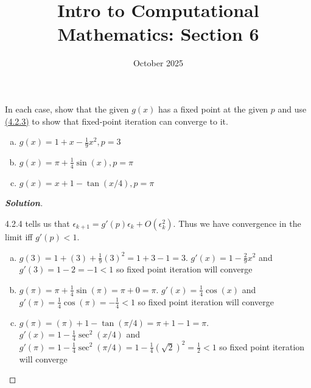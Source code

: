 \documentclass[11pt]{article}
\title{Intro to Computational Mathematics: Section 6}
\date{October 2025}
\newenvironment{problem}[2][Question]{\begin{trivlist}
\item[\hskip \labelsep {\bfseries #1}\hskip \labelsep {\bfseries #2.}]}{\end{trivlist}}
\newenvironment{solution}{%
  \begin{proof}[\textbf{Solution}]$ $\par\nobreak\ignorespaces
}{%
  \end{proof}
}
\theoremstyle{definition}
\begin{document}
\maketitle

\begin{problem}{4.2.1}
In each case, show that the given $g(x)$ has a fixed point at the given $p$ and use \href{https://fncbook.com/fixed-point/#fpconverge}{(4.2.3)} to show that fixed-point iteration can converge to it.
\begin{enumerate}[(a)]
    \item $g(x) = 1 + x - \frac{1}{9}x^2, p = 3$
    \item $g(x) = \pi + \frac{1}{4}\sin(x), p = \pi$
    \item $g(x) = x + 1 - \tan(x/4), p = \pi$
\end{enumerate}
\end{problem}
\begin{solution}
4.2.4 tells us that $\epsilon_{k+1} = g'(p)\epsilon_k + O(\epsilon_k^2)$. Thus we have convergence in the limit iff $g'(p) < 1$.
\begin{enumerate}[(a)]
    \item $g(3) = 1 + (3) + \frac{1}{9}(3)^2 = 1 + 3 - 1 = 3$. $g'(x) = 1 - \frac{2}{9}x^2$ and $g'(3) = 1 - 2 = -1 < 1$ so fixed point iteration will converge
    \item $g(\pi) = \pi + \frac{1}{4}\sin(\pi) = \pi + 0 = \pi$. $g'(x) = \frac{1}{4}\cos(x)$ and $g'(\pi) = \frac{1}{4}\cos(\pi) = -\frac{1}{4} < 1$ so fixed point iteration will converge
    \item $g(\pi) = (\pi) + 1 - \tan(\pi/4) = \pi + 1 - 1 = \pi$. $g'(x) = 1 - \frac{1}{4}\sec^2(x/4)$ and $g'(\pi) = 1 - \frac{1}{4}\sec^2(\pi/4) = 1 - \frac{1}{4}(\sqrt{2})^2 = \frac{1}{2} < 1$ so fixed point iteration will converge
\end{enumerate}
\end{solution}
\end{document}
